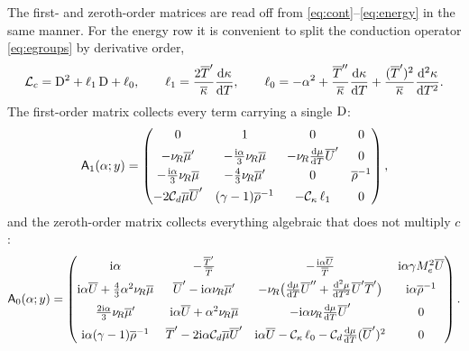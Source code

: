 \documentclass[11pt]{article}
\begin{document}
The first- and zeroth-order matrices are read off from \eqref{eq:cont}--\eqref{eq:energy} in the
same manner. For the energy row it is convenient to split the conduction operator \eqref{eq:egroups}
by derivative order,
\begin{equation}\label{eq:lcsplit}
  \mathcal L_c=\mathrm{D}^2+\ell_1\,\mathrm{D}+\ell_0,\qquad
  \ell_1=\frac{2\overline{T}'}{\overline{\kappa}}\frac{\mathrm d\kappa}{\mathrm dT},\qquad
  \ell_0=-\alpha^2+\frac{\overline{T}''}{\overline{\kappa}}\frac{\mathrm d\kappa}{\mathrm dT}
        +\frac{(\overline{T}')^2}{\overline{\kappa}}\frac{\mathrm d^2\kappa}{\mathrm dT^2}.
\end{equation}
The first-order matrix collects every term carrying a single $\mathrm{D}$:
\begin{equation}\label{eq:A1mat}
  \mathsf A_1(\alpha;y)=
  \begin{pmatrix}
    0 & 1 & 0 & 0\\[3pt]
    -\nu_{\!R}\overline{\mu}' & -\tfrac{\mathrm{i}\alpha}{3}\nu_{\!R}\overline{\mu} & -\nu_{\!R}\tfrac{\mathrm d\mu}{\mathrm dT}\overline{U}' & 0\\[3pt]
    -\tfrac{\mathrm{i}\alpha}{3}\nu_{\!R}\overline{\mu} & -\tfrac43\nu_{\!R}\overline{\mu}' & 0 & \overline{\rho}^{-1}\\[3pt]
    -2\mathcal C_d\overline{\mu}\overline{U}' & (\gamma-1)\overline{\rho}^{-1} & -\mathcal C_\kappa\,\ell_1 & 0
  \end{pmatrix},
\end{equation}
and the zeroth-order matrix collects everything algebraic that does not multiply $c$:
{\small
\begin{equation}\label{eq:A0mat}
  \mathsf A_0(\alpha;y)=
  \begin{pmatrix}
    \mathrm{i}\alpha & -\tfrac{\overline{T}'}{\overline{T}} & -\tfrac{\mathrm{i}\alpha\overline{U}}{\overline{T}} &
      \mathrm{i}\alpha\gamma M_e^2\overline{U}\\[5pt]
    \mathrm{i}\alpha\overline{U}+\tfrac43\alpha^2\nu_{\!R}\overline{\mu} & \overline{U}'-\mathrm{i}\alpha\nu_{\!R}\overline{\mu}' &
      -\nu_{\!R}\big(\tfrac{\mathrm d\mu}{\mathrm dT}\overline{U}''
        +\tfrac{\mathrm d^2\mu}{\mathrm dT^2}\overline{U}'\overline{T}'\big) & \mathrm{i}\alpha\overline{\rho}^{-1}\\[5pt]
    \tfrac{2\mathrm{i}\alpha}{3}\nu_{\!R}\overline{\mu}' & \mathrm{i}\alpha\overline{U}+\alpha^2\nu_{\!R}\overline{\mu} &
      -\mathrm{i}\alpha\nu_{\!R}\tfrac{\mathrm d\mu}{\mathrm dT}\overline{U}' & 0\\[5pt]
    \mathrm{i}\alpha(\gamma-1)\overline{\rho}^{-1} & \overline{T}'-2\mathrm{i}\alpha\mathcal C_d\overline{\mu}\overline{U}' &
      \mathrm{i}\alpha\overline{U}-\mathcal C_\kappa\,\ell_0
        -\mathcal C_d\tfrac{\mathrm d\mu}{\mathrm dT}(\overline{U}')^2 & 0
  \end{pmatrix}.
\end{equation}}%
\end{document}
